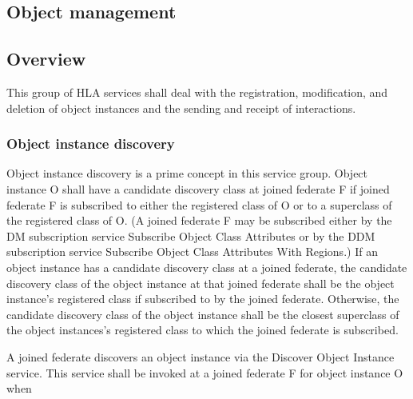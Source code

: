 
\clearpage

\begin{compactstdpage}

    \section{Object management}

    \subsection{Overview}


    This group of HLA services shall deal with the registration, modification, and deletion of object instances and the sending and receipt of interactions.

    \subsubsection{Object instance discovery}


    Object instance discovery is a prime concept in this service group. Object instance O shall have a candidate discovery class at joined federate F if joined federate F is subscribed to either the registered class of O or to a superclass of the registered class of O. (A joined federate F may be subscribed either by the DM subscription service Subscribe Object Class Attributes or by the DDM subscription service Subscribe Object Class Attributes With Regions.) If an object instance has a candidate discovery class at a joined federate, the candidate discovery class of the object instance at that joined federate shall be the object instance's registered class if subscribed to by the joined federate. Otherwise, the candidate discovery class of the object instance shall be the closest superclass of the object instances's registered class to which the joined federate is subscribed.


    A joined federate discovers an object instance via the Discover Object Instance \rtiinitiated{} service. This service shall be invoked at a joined federate F for object instance O when





\end{compactstdpage}
